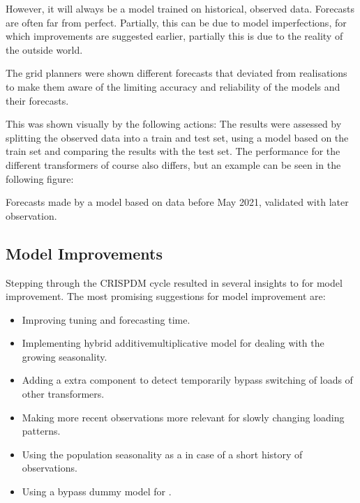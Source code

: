 \documentclass[letterpaper,10pt,english]{sphinxmanual}
\let\sphinxpxdimen\pdfpxdimen\else\newdimen\sphinxpxdimen
\begin{document}
However, it will always be a model trained on historical, observed data. Forecasts are often far from perfect.
Partially, this can be due to model imperfections, for which improvements are suggested earlier, partially this is due to the reality of the outside world.

The grid planners were shown different forecasts that deviated from realisations to make them aware of the limiting accuracy and reliability of the models and their forecasts.

This was shown visually by the following actions:
The results were assessed by splitting the observed data into a train and test set, using a model based on the train set and comparing the results with the test set.
The performance for the different transformers of course also differs, but an example can be seen in the following figure:
\begin{quote}

\noindent{\hspace*{\fill}\sphinxincludegraphics[width=800\sphinxpxdimen]{{validation}.png}\hspace*{\fill}}
\end{quote}

Forecasts made by a model based on data before May 2021, validated with later observation.


\subsection{Model Improvements}
\label{\detokenize{evaluation:model-improvements}}
Stepping through the CRISP\sphinxhyphen{}DM cycle resulted in several insights to for model improvement.
The most promising suggestions for model improvement are:
\begin{itemize}
\item {} 
Improving tuning and forecasting time.

\item {} 
Implementing hybrid additive\sphinxhyphen{}multiplicative model for dealing with the growing seasonality.

\item {} 
Adding a extra component to detect temporarily bypass switching of loads of other transformers.

\item {} 
Making more recent observations more relevant for slowly changing loading patterns.

\item {} 
Using the population seasonality as a  in case of a short history of observations.

\item {} 
Using a by\sphinxhyphen{}pass dummy model for .

\end{itemize}
\end{document}
